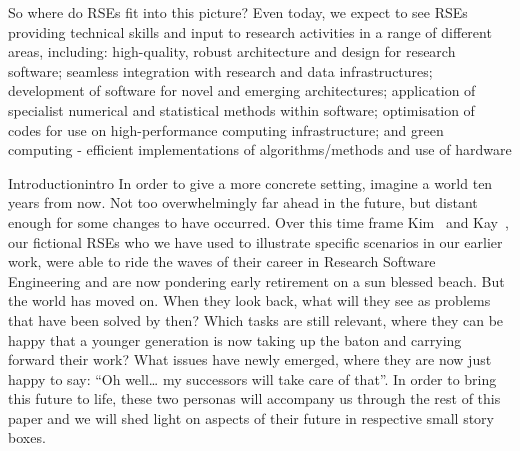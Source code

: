 \documentclass{eceasst}
\begin{document}
So where do RSEs fit into this picture? Even today, we expect to see RSEs providing technical skills and input
to research activities in a range of different areas, including:
high-quality, robust architecture and design for research software;
seamless integration with research and data infrastructures;
development of software for novel and emerging architectures;
application of specialist numerical and statistical methods within software;
optimisation of codes for use on high-performance computing infrastructure;
and green computing - efficient implementations of algorithms/methods and use of hardware

\begin{story}{Introduction}{intro}
In order to give a more concrete setting, imagine a world ten years from now.
Not too overwhelmingly far ahead in the future, but distant enough for some changes to have occurred.
Over this time frame Kim~\cite{Anzt2021} and Kay~\cite{Goth2024},
our fictional RSEs who we have used to illustrate specific scenarios in our earlier work,
were able to ride the waves of their career in Research Software Engineering and are now pondering early retirement on a sun blessed beach.
But the world has moved on.
When they look back, what will they see as problems that have been solved by then?
Which tasks are still relevant, where they can be happy that a younger generation is now taking up the baton and carrying forward their work?
What issues have newly emerged, where they are now just happy to say: “Oh well… my successors will take care of that”.
In order to bring this future to life, these two personas will accompany us through the rest of this paper and we will shed light on aspects
of their future in respective small story boxes.
\end{story}
\end{document}
